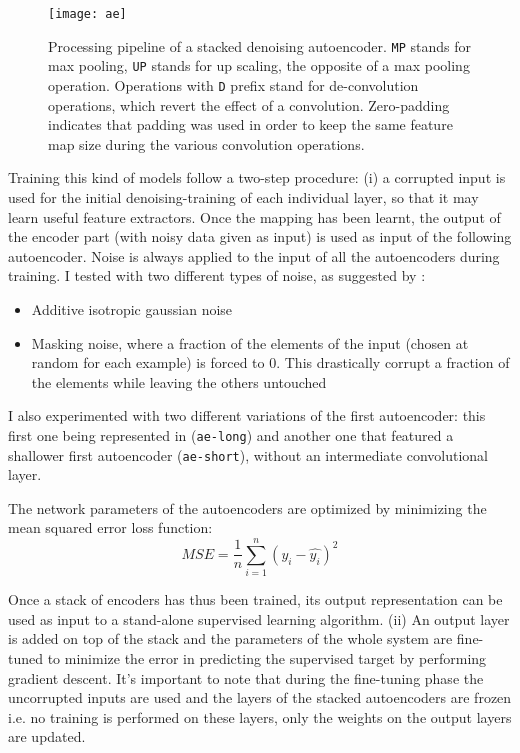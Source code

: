 \begin{figure*}[ht]
	\captionsetup{font=scriptsize, justification=centering}
    \centering
	\texttt{[image: ae]}
    \caption{Processing pipeline of a stacked denoising autoencoder. \texttt{MP} stands for max pooling, \texttt{UP} stands for up scaling, the opposite of a max pooling operation. Operations with \texttt{D} prefix stand for de-convolution operations, which revert the effect of a convolution. Zero-padding indicates that padding was used in order to keep the same feature map size during the various convolution operations.}
    \label{fig:img_ae}
\end{figure*}

Training this kind of models follow a \mbox{two-step} procedure: (i) a corrupted input is used for the initial \mbox{denoising-training} of each individual layer, so that it may learn useful feature extractors. Once the mapping has been learnt, the output of the encoder part (with noisy data given as input) is used as input of the following autoencoder. Noise is always applied to the input of all the autoencoders during training. I tested with two different types of noise, as suggested by \cite{Pascal-2010}:

\begin{itemize}
\item Additive isotropic gaussian noise
\item Masking noise, where a fraction of the elements of the input (chosen at random for each example) is forced to 0. This drastically corrupt a fraction of the elements while leaving the others untouched
\end{itemize}

I also experimented with two different variations of the first autoencoder: this first one being represented in  (\texttt{ae-long}) and another one that featured a shallower first autoencoder (\texttt{ae-short}), without an intermediate convolutional layer.

The network parameters of the autoencoders are optimized by minimizing the mean squared error loss function:
$$MSE = \frac{1}{n} \sum_{i=1}^{n}(y_i - \hat{y_i})^2$$

Once a stack of encoders has thus been trained, its output representation can be used as input to a \mbox{stand-alone} supervised learning algorithm. (ii) An output layer is added on top of the stack and the parameters of the whole system are \mbox{fine-tuned} to minimize the error in predicting the supervised target by performing gradient descent. It's important to note that during the \mbox{fine-tuning} phase the uncorrupted inputs are used and the layers of the stacked autoencoders are frozen i.e. no training is performed on these layers, only the weights on the output layers are updated.